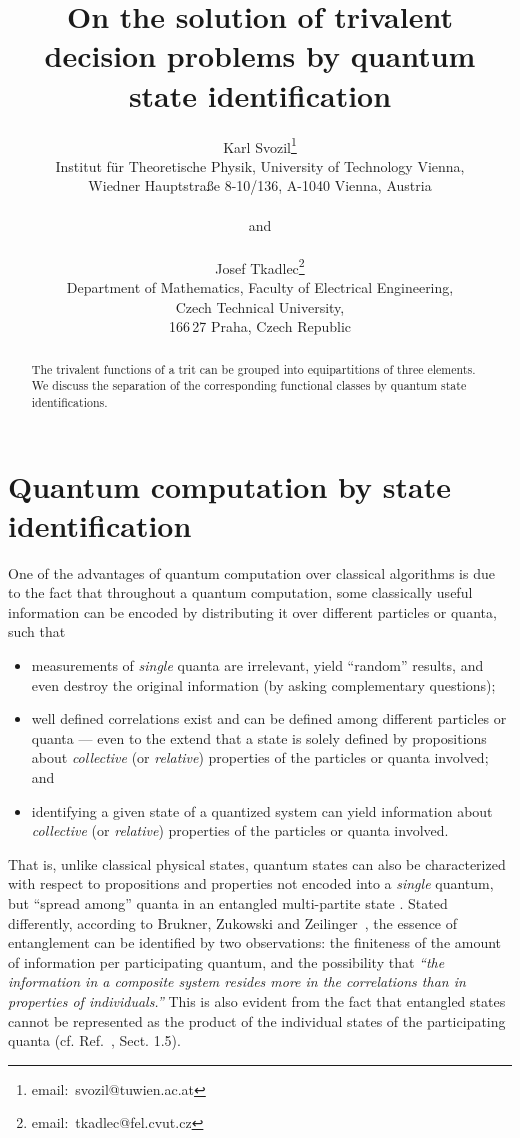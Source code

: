 \documentclass{article}
\title{On the solution of trivalent decision problems by quantum state identification}
\author{Karl Svozil\footnote{email:~svozil@tuwien.ac.at}\\
        Institut f\"ur Theoretische Physik, University of Technology Vienna,\\
        Wiedner Hauptstra\ss e 8-10/136, A-1040 Vienna, Austria\\ \\
        and \\   \\
        Josef Tkadlec\footnote{email:~tkadlec@fel.cvut.cz}\\
        Department of Mathematics, Faculty of Electrical Engineering, \\
        Czech Technical University,\\
        166\,27 Praha, Czech Republic
       }
\begin{document}
\maketitle
\begin{abstract}
The trivalent functions of a trit can be grouped into equipartitions of three elements. We discuss the separation of the corresponding functional classes by quantum state identifications.
\end{abstract}





\section{Quantum computation by state identification}

One of the advantages of quantum computation \cite{Gruska,nielsen-book,mermin-07,benn:97,Ozhigov:1997,bbcmw-01,cleve-99,fortnov-03}
over classical algorithms \cite{rogers1,odi:89} is due to
the fact that throughout a quantum computation, some classically useful information
can be encoded by distributing it over different particles or quanta,
such that \cite{mermin-02,svozil-2005-ko}
\begin{itemize}
\item
measurements of {\em single} quanta are irrelevant, yield ``random'' results,
and even destroy the original information (by asking complementary questions);
\item
well defined correlations exist and can be defined among different particles or quanta ---
even to the extend that a state is solely defined by propositions
about {\em collective} (or {\em relative})  properties of the particles or quanta involved;
and
\item
identifying a given state of a quantized system can yield information about
{\em collective} (or {\em relative})  properties of the particles or quanta involved.
\end{itemize}
That is, unlike classical physical states, quantum states can also be characterized with respect to
propositions and properties not encoded into a {\em single} quantum, but ``spread among''
quanta in an entangled multi-partite state
\cite{zeil-99,zeil-bruk-99,zeil-bruk-99a,zeil-bruk-02,DonSvo01,svozil-2002-statepart-prl,svozil-2003-garda}.
Stated differently, according to Brukner, Zukowski and Zeilinger~\cite{zeil-Zuk-bruk-01},
the essence of entanglement can be identified by two observations: the finiteness of the amount of information per participating quantum,
and the possibility that {\em ``the information in a composite system resides more
in the correlations than in properties of individuals.''}
This is also evident from the fact that entangled states cannot be represented as the product of the individual states of the participating quanta
(cf. Ref.~\cite{mermin-07}, Sect. 1.5).
\end{document}
